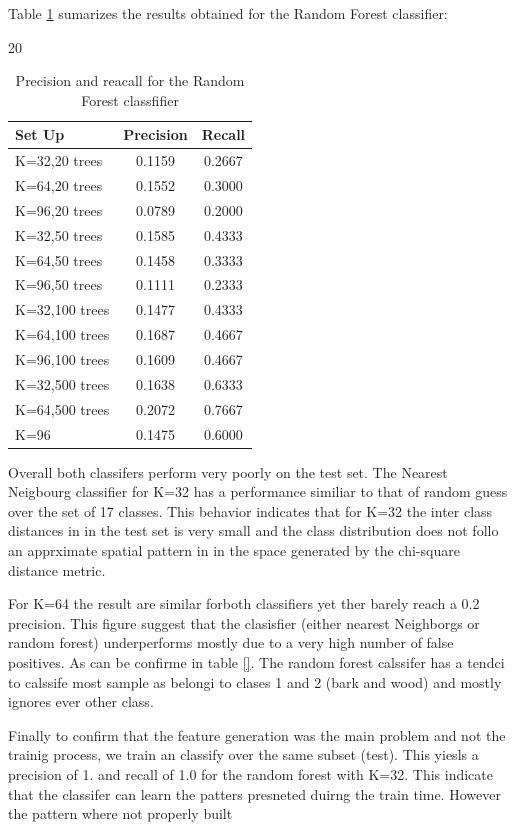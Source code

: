 \documentclass[a4paper]{article}
\begin{document}
Table \ref{table:table2}  sumarizes the results obtained for the Random Forest classifier:

20
\begin{table}[t]
\centering
\begin{tabular}{ l | c | c}
Set Up & Precision & Recall   \\
\hline	
K=32,20 trees & 0.1159 & 0.2667 \\
K=64,20 trees & 0.1552 & 0.3000 \\
K=96,20 trees & 0.0789  &  0.2000 \\
K=32,50 trees & 0.1585 & 0.4333 \\
K=64,50 trees & 0.1458 & 0.3333 \\
K=96,50 trees &  0.1111 &  0.2333\\
K=32,100 trees & 0.1477 & 0.4333  \\
K=64,100 trees & 0.1687 & 0.4667  \\
K=96,100 trees & 0.1609 &  0.4667\\
K=32,500 trees & 0.1638 & 0.6333  \\
K=64,500 trees & 0.2072  &  0.7667 \\
K=96 & 0.1475 & 0.6000  \\

\end{tabular}
\caption{Precision and reacall for the Random Forest classfifier}
\label{table:table2}
\end{table}


Overall both classifers perform very poorly on the test set. The Nearest Neigbourg classifier for K=32 has a performance similiar to that of random guess over the set of 17 classes. This behavior indicates that for K=32 the inter class distances in in the test set is very small and the class distribution does not follo an apprximate spatial pattern in in the space generated by the chi-square distance metric. 

For K=64 the result are similar forboth classifiers yet ther barely reach a 0.2 precision. This figure suggest that the clasisfier (either nearest Neighborgs or random forest) underperforms mostly due to a very high number of false positives. As can be confirme in table \ref{}. The random forest calssifer has a tendci to calssife most sample as belongi to clases 1 and 2 (bark and wood) and mostly ignores ever other class. 

Finally to confirm that the feature generation was the main problem and not the trainig process, we train an classify over the same subset (test). This yiesls a precision  of 1. and recall of 1.0 for the random forest with K=32. This indicate that the classifer can learn the patters presneted duirng the train time. However the pattern where not properly built






\end{document}
